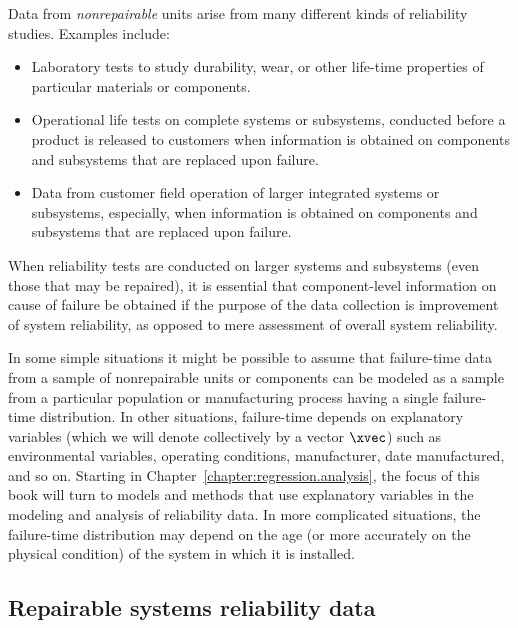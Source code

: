 Data from {\em nonrepairable} units
arise from many different kinds of reliability studies.  Examples
include:
\begin{itemize}
\item
Laboratory tests to study durability, wear, or other life-time
properties of particular materials or components.
\item
Operational life tests on complete systems or subsystems, conducted
before a product is released to customers when information is obtained
on components and subsystems that are replaced upon failure.
\item
Data from customer field operation of larger integrated systems or
subsystems, especially, when information is obtained on components and
subsystems that are replaced upon failure.
\end{itemize}
When reliability tests are conducted on larger systems and subsystems
(even those that may be repaired), it is essential that
component-level information on cause of failure be obtained if the
purpose of the data collection is improvement of system reliability,
as opposed to mere assessment of overall system reliability.


In some simple situations it might be possible to assume that
failure-time data from a sample of nonrepairable units or
components can be modeled as a sample from a particular population or
manufacturing process having a single failure-time distribution.
In other situations, failure-time depends on explanatory variables
(which we will denote collectively by a vector $\xvec$) such as
environmental variables, operating conditions, manufacturer, date
manufactured, and so on. Starting in
Chapter~\ref{chapter:regression.analysis}, the focus of this book will
turn to models and methods that use explanatory variables in the
modeling and analysis of reliability data. In more complicated
situations,
the failure-time distribution may depend on the age (or more
accurately
on the physical condition) of the system in which it is installed.


\subsection{Repairable systems reliability data}

